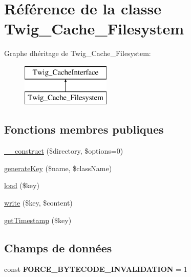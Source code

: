 \hypertarget{class_twig___cache___filesystem}{}\section{Référence de la classe Twig\+\_\+\+Cache\+\_\+\+Filesystem}
\label{class_twig___cache___filesystem}
Graphe d\textquotesingle{}héritage de Twig\+\_\+\+Cache\+\_\+\+Filesystem\+:\begin{figure}[H]
\begin{center}
\leavevmode
\includegraphics[height=2.000000cm]{class_twig___cache___filesystem}
\end{center}
\end{figure}
\subsection*{Fonctions membres publiques}
\begin{DoxyCompactItemize}
\item 
\hyperlink{class_twig___cache___filesystem_acdbb962b6c9084f9adaa55fb003fd8ed}{\+\_\+\+\_\+construct} (\$directory, \$options=0)
\item 
\hyperlink{class_twig___cache___filesystem_aa552341b7edde6c210aef20fdd86986e}{generate\+Key} (\$name, \$class\+Name)
\item 
\hyperlink{class_twig___cache___filesystem_a8d0a51036af71436a1e8dcc26fc4281d}{load} (\$key)
\item 
\hyperlink{class_twig___cache___filesystem_abdff0953b972adfc563b2e2573d4920b}{write} (\$key, \$content)
\item 
\hyperlink{class_twig___cache___filesystem_aff0cbcd61bb5f05632e20fd0baf65714}{get\+Timestamp} (\$key)
\end{DoxyCompactItemize}
\subsection*{Champs de données}
\begin{DoxyCompactItemize}
\item 
const {\bfseries F\+O\+R\+C\+E\+\_\+\+B\+Y\+T\+E\+C\+O\+D\+E\+\_\+\+I\+N\+V\+A\+L\+I\+D\+A\+T\+I\+ON} = 1\hypertarget{class_twig___cache___filesystem_ae234eda1efdf02107556d9b4d8e4846c}{}\label{class_twig___cache___filesystem_ae234eda1efdf02107556d9b4d8e4846c}

\end{DoxyCompactItemize}


